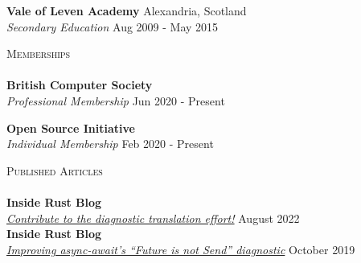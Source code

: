 \documentclass[a4paper]{article}
\newcommand{\lineunder} {
  \vspace*{-8pt} \\
  \hspace*{-18pt} \hrulefill \\
}
\newcommand{\header} [1] {
  {\hspace*{-18pt}\vspace*{6pt} \textsc{#1}}
  \vspace*{-6pt} \lineunder
}
\begin{document}
\textbf{Vale of Leven Academy} \hfill {\color{gray} Alexandria, Scotland} \\
\textit{Secondary Education} \hfill {\color{gray} Aug 2009 - May 2015} \\
\vspace{2mm}

\header{Memberships}
\textbf{British Computer Society} \\
\textit{Professional Membership} \hfill {\color{gray} Jun 2020 - Present} \\
\vspace{2mm}

\textbf{Open Source Initiative} \\
\textit{Individual Membership} \hfill {\color{gray} Feb 2020 - Present} \\
\vspace{2mm}

\header{Published Articles}
\textbf{Inside Rust Blog} \\
\textit{\href{https://blog.rust-lang.org/inside-rust/2022/08/16/diagnostic-effort.html}{Contribute to the diagnostic translation effort!}} \hfill {\color{gray} August 2022} \\
\textbf{Inside Rust Blog} \\
\textit{\href{https://blog.rust-lang.org/inside-rust/2019/10/11/AsyncAwait-Not-Send-Error-Improvements.html}{Improving async-await's ``Future is not Send'' diagnostic}} \hfill {\color{gray} October 2019} \\
\vspace{2mm}

\end{document}

